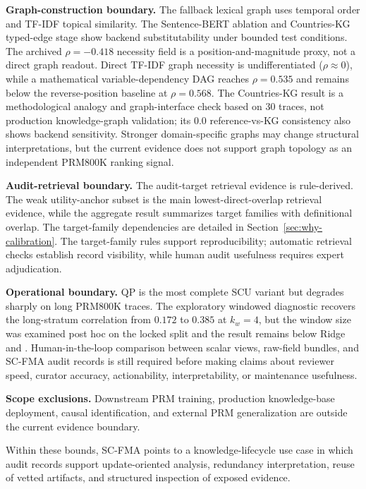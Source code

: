 \textbf{Graph-construction boundary.} The fallback lexical graph uses temporal order and TF-IDF topical similarity. The Sentence-BERT ablation and Countries-KG typed-edge stage show backend substitutability under bounded test conditions. The archived $\rho=-0.418$ necessity field is a position-and-magnitude proxy, not a direct graph readout. Direct TF-IDF graph necessity is undifferentiated ($\rho\approx0$), while a mathematical variable-dependency DAG reaches $\rho=0.535$ and remains below the reverse-position baseline at $\rho=0.568$. The Countries-KG result is a methodological analogy and graph-interface check based on 30 traces, not production knowledge-graph validation; its 0.0 reference-vs-KG consistency also shows backend sensitivity. Stronger domain-specific graphs may change structural interpretations, but the current evidence does not support graph topology as an independent PRM800K ranking signal.

\textbf{Audit-retrieval boundary.} The audit-target retrieval evidence is rule-derived. The weak utility-anchor subset is the main lowest-direct-overlap retrieval evidence, while the aggregate result summarizes target families with definitional overlap. The target-family dependencies are detailed in Section~\ref{sec:why-calibration}. The target-family rules support reproducibility; automatic retrieval checks establish record visibility, while human audit usefulness requires expert adjudication.

\textbf{Operational boundary.} QP is the most complete SCU variant but degrades sharply on long PRM800K traces. The exploratory windowed diagnostic recovers the long-stratum correlation from $0.172$ to $0.385$ at $k_w=4$, but the window size was examined post hoc on the locked split and the result remains below Ridge and \wstruct{}. Human-in-the-loop comparison between scalar views, raw-field bundles, and SC-FMA audit records is still required before making claims about reviewer speed, curator accuracy, actionability, interpretability, or maintenance usefulness.

\medskip
\noindent\textbf{Scope exclusions.} Downstream PRM training, production knowledge-base deployment, causal identification, and external PRM generalization are outside the current evidence boundary.

\noindent Within these bounds, SC-FMA points to a knowledge-lifecycle use case in which audit records support update-oriented analysis, redundancy interpretation, reuse of vetted artifacts, and structured inspection of exposed evidence.

